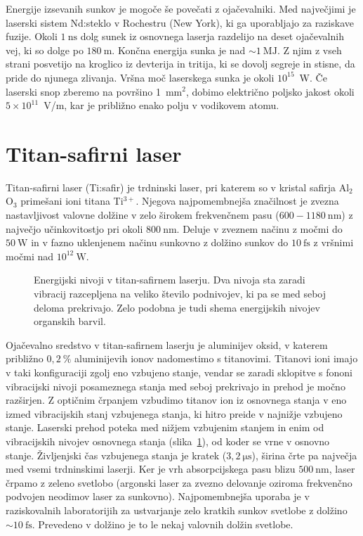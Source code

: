\begin{remark}
Energije izsevanih sunkov je mogoče še povečati z ojačevalniki. Med največjimi je
laserski sistem Nd:steklo v Rochestru (New York), ki ga uporabljajo
za raziskave fuzije. Okoli $1~\si{\nano\second}$ dolg sunek iz osnovnega laserja razdelijo na
deset ojačevalnih vej, ki so dolge po $180~\si{\metre}$.
Končna energija sunka je nad $\sim 1~\si{\mega\joule}$. Z njim z vseh strani posvetijo na
kroglico iz devterija in tritija, ki se dovolj segreje in stisne, da pride
do njunega zlivanja. Vršna moč laserskega sunka je okoli $10^{15}$~W. 
Če laserski snop zberemo na površino 1~mm$^2$, dobimo električno poljsko jakost
okoli $5 \times 10^{11}$~V/m, kar je približno enako polju v vodikovem atomu.
\end{remark}

\section{Titan-safirni laser}
Titan-safirni laser (Ti:safir) je trdninski laser, pri katerem so v kristal safirja
Al$_2$O$_3$ primešani ioni titana Ti$^{3+}$. Njegova najpomembnejša značilnost je
zvezna nastavljivost valovne dolžine v zelo širokem frekvenčnem pasu 
($600-1180~\si{\nano\metre}$) z največjo učinkovitostjo pri okoli $800~\si{\nano\metre}$. Deluje
v zveznem načinu z močmi do $50~\si{\watt}$ in v fazno uklenjenem načinu sunkovno 
z dolžino sunkov do $10~\si{\femto\second}$ z vršnimi močmi nad $10^{12}~\si{\watt}$. 
\begin{figure}[h]
\centering
\def\svgwidth{90truemm} 

\caption{Energijski nivoji v titan-safirnem laserju. Dva nivoja sta zaradi vibracij
razcepljena na veliko število podnivojev, ki pa se med seboj deloma prekrivajo.
Zelo podobna je tudi shema energijskih nivojev organskih barvil. 
}
\label{fig:TiE}
\end{figure} 

Ojačevalno sredstvo v titan-safirnem laserju je aluminijev oksid, v katerem 
približno $0,2~\%$ aluminijevih ionov nadomestimo s titanovimi. Titanovi ioni imajo 
v taki konfiguraciji zgolj eno vzbujeno stanje, vendar se zaradi sklopitve s fononi
vibracijski nivoji posameznega stanja med seboj prekrivajo in prehod je močno razširjen. 
Z optičnim črpanjem vzbudimo titanov ion iz osnovnega stanja v eno izmed vibracijskih 
stanj vzbujenega stanja, ki hitro preide v najnižje vzbujeno stanje. 
Laserski prehod poteka med nižjem vzbujenim stanjem in enim od vibracijskih 
nivojev osnovnega stanja (slika~\ref{fig:TiE}), od koder se vrne v osnovno stanje. Življenjski čas
vzbujenega stanja je kratek ($3,2~\si{\micro\second}$), širina črte pa največja med
vsemi trdninskimi laserji. Ker je vrh absorpcijskega pasu blizu $500~\si{\nano\metre}$,
laser črpamo z zeleno svetlobo (argonski laser za zvezno delovanje oziroma
frekvenčno podvojen neodimov laser za sunkovno). 
Najpomembnejša uporaba je v raziskovalnih laboratorijih za ustvarjanje zelo 
kratkih sunkov svetlobe z dolžino $\sim 10~\si{\femto\second}$. Prevedeno v dolžino 
je to le nekaj valovnih dolžin svetlobe. 

